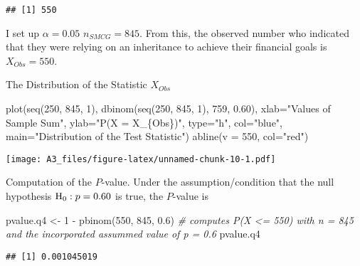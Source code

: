 \documentclass[
]{article}
\newenvironment{Shaded}{\begin{snugshade}}{\end{snugshade}}
\newcommand{\AttributeTok}[1]{\textcolor[rgb]{0.77,0.63,0.00}{#1}}
\newcommand{\CommentTok}[1]{\textcolor[rgb]{0.56,0.35,0.01}{\textit{#1}}}
\newcommand{\DecValTok}[1]{\textcolor[rgb]{0.00,0.00,0.81}{#1}}
\newcommand{\FloatTok}[1]{\textcolor[rgb]{0.00,0.00,0.81}{#1}}
\newcommand{\FunctionTok}[1]{\textcolor[rgb]{0.00,0.00,0.00}{#1}}
\newcommand{\NormalTok}[1]{#1}
\newcommand{\OtherTok}[1]{\textcolor[rgb]{0.56,0.35,0.01}{#1}}
\newcommand{\SpecialCharTok}[1]{\textcolor[rgb]{0.00,0.00,0.00}{#1}}
\newcommand{\StringTok}[1]{\textcolor[rgb]{0.31,0.60,0.02}{#1}}
\begin{document}
\begin{verbatim}
## [1] 550
\end{verbatim}

I set up \(\alpha = 0.05\) \(n_{SMCG} = 845\). From this, the observed
number who indicated that they were relying on an inheritance to achieve
their financial goals is \(X_{Obs} = 550\).

The Distribution of the Statistic \(X_{Obs}\)

\begin{Shaded}
\begin{Highlighting}[]
\FunctionTok{plot}\NormalTok{(}\FunctionTok{seq}\NormalTok{(}\DecValTok{250}\NormalTok{, }\DecValTok{845}\NormalTok{, }\DecValTok{1}\NormalTok{), }\FunctionTok{dbinom}\NormalTok{(}\FunctionTok{seq}\NormalTok{(}\DecValTok{250}\NormalTok{, }\DecValTok{845}\NormalTok{, }\DecValTok{1}\NormalTok{), }\DecValTok{759}\NormalTok{, }\FloatTok{0.60}\NormalTok{), }\AttributeTok{xlab=}\StringTok{"Values of Sample Sum"}\NormalTok{, }\AttributeTok{ylab=}\StringTok{"P(X = X\_\{Obs\})"}\NormalTok{, }\AttributeTok{type=}\StringTok{"h"}\NormalTok{, }\AttributeTok{col=}\StringTok{"blue"}\NormalTok{, }\AttributeTok{main=}\StringTok{"Distribution of the Test Statistic"}\NormalTok{)}
\FunctionTok{abline}\NormalTok{(}\AttributeTok{v =} \DecValTok{550}\NormalTok{, }\AttributeTok{col=}\StringTok{"red"}\NormalTok{)}
\end{Highlighting}
\end{Shaded}

\texttt{[image: A3\_files/figure-latex/unnamed-chunk-10-1.pdf]}

Computation of the \(P\)-value. Under the assumption/condition that the
null hypothesis \({\rm H}_{0}: p = 0.60\) is true, the \(P\)-value is

\begin{Shaded}
\begin{Highlighting}[]
\NormalTok{pvalue.q4 }\OtherTok{\textless{}{-}} \DecValTok{1} \SpecialCharTok{{-}} \FunctionTok{pbinom}\NormalTok{(}\DecValTok{550}\NormalTok{, }\DecValTok{845}\NormalTok{, }\FloatTok{0.6}\NormalTok{) }\CommentTok{\# computes P(X \textless{}= 550) with n = 845 and the incorporated assummed value of p = 0.6}
\NormalTok{pvalue.q4}
\end{Highlighting}
\end{Shaded}

\begin{verbatim}
## [1] 0.001045019
\end{verbatim}
\end{document}
